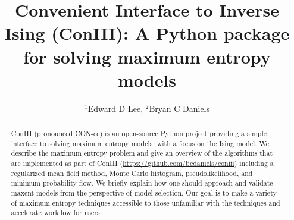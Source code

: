 \documentclass[aps,prl,twocolumn,nofootinbib]{revtex4-1}
\begin{document}
\newcommand{\mr}[1]{\mathrm{#1}}
\newcommand{\mb}[1]{\mathbf{#1}}
\newcommand{\br}[1]{\left<#1\right>}
\newcommand{\bl}[1]{\left|#1\right|}
\newcommand{\mc}[1]{\mathcal{#1}}
\newcommand{\tb}[1]{\textcolor{blue}{#1}}
\newcommand{\tr}[1]{\textcolor{red}{#1}}
\newcommand{\tg}[1]{\textcolor{green}{#1}}
\newcommand{\si}[0]{{\rm s}_{\rm i}}
\newcommand{\sj}[0]{{\rm s}_{\rm j}}
\newcommand{\bs}[1]{\boldsymbol{#1}}
\newcommand{\rs}[0]{{\rm s}}
\newcommand{\rk}[0]{{\rm k}}

\title{Convenient Interface to Inverse Ising (ConIII): A Python package for solving maximum entropy models}
\author{$^1$Edward D Lee, $^2$Bryan C Daniels}

\begin{abstract}
ConIII (pronounced CON-ee) is an open-source Python project providing a simple interface to solving maximum entropy models, with a focus on the Ising model. We describe the maximum entropy problem and give an overview of the algorithms that are implemented as part of ConIII (\url{https://github.com/bcdaniels/coniii}) including a regularized mean field method, Monte Carlo histogram, pseudolikelihood, and minimum probability flow. We briefly explain how one should approach and validate maxent models from the perspective of model selection. Our goal is to make a variety of maximum entropy techniques accessible to those unfamiliar with the techniques and accelerate workflow for users.
\end{abstract}

\maketitle
\end{document}
